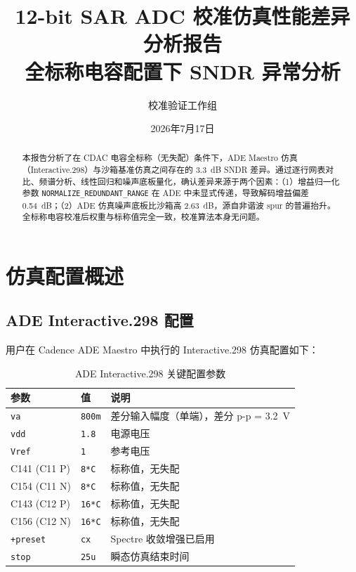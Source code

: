 \documentclass[12pt,a4paper]{article}
\title{12-bit SAR ADC 校准仿真性能差异分析报告\\[0.5em]
\large 全标称电容配置下 SNDR 异常分析}
\author{校准验证工作组}
\date{2026年7月17日}
\begin{document}
\maketitle

\begin{abstract}
本报告分析了在 CDAC 电容全标称（无失配）条件下，ADE Maestro 仿真（Interactive.298）与沙箱基准仿真之间存在的 \SI{3.3}{dB} SNDR 差异。通过逐行网表对比、频谱分析、线性回归和噪声底板量化，确认差异来源于两个因素：（1）增益归一化参数 \texttt{NORMALIZE\_REDUNDANT\_RANGE} 在 ADE 中未显式传递，导致解码增益偏差 \SI{0.54}{dB}；（2）ADE 仿真噪声底板比沙箱高 \SI{2.63}{dB}，源自非谐波 spur 的普遍抬升。全标称电容校准后权重与标称值完全一致，校准算法本身无问题。
\end{abstract}

\section{仿真配置概述}

\subsection{ADE Interactive.298 配置}

用户在 Cadence ADE Maestro 中执行的 Interactive.298 仿真配置如下：

\begin{table}[H]
\centering
\caption{ADE Interactive.298 关键配置参数}
\label{tab:ade298_config}
\begin{tabular}{lll}
\toprule
参数 & 值 & 说明 \\
\midrule
\texttt{va} & \texttt{800m} & 差分输入幅度（单端），差分 p-p = \SI{3.2}{V} \\
\texttt{vdd} & \texttt{1.8} & 电源电压 \\
\texttt{Vref} & \texttt{1} & 参考电压 \\
C141 (C11 P) & \texttt{8*C} & 标称值，无失配 \\
C154 (C11 N) & \texttt{8*C} & 标称值，无失配 \\
C143 (C12 P) & \texttt{16*C} & 标称值，无失配 \\
C156 (C12 N) & \texttt{16*C} & 标称值，无失配 \\
\texttt{+preset} & \texttt{cx} & Spectre 收敛增强已启用 \\
\texttt{stop} & \texttt{25u} & 瞬态仿真结束时间 \\
\bottomrule
\end{tabular}
\end{table}
\end{document}

